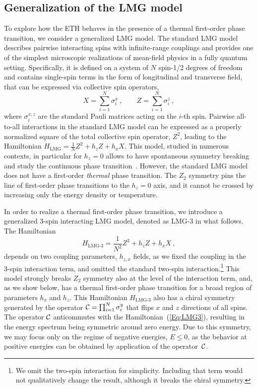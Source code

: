 \documentclass[aps,prx,showpacs,amsmath,amssymb,superscriptaddress,twocolumn,longbibliography,10pt,nofootinbib]{revtex4-2}
\begin{document}
\subsection{Generalization of the LMG model}
To explore how the ETH behaves in the presence of a thermal first-order phase transition, we consider a generalized LMG model.  The standard LMG model~\cite{LMG65,Trombettoni23} describes pairwise interacting spins with infinite-range couplings and provides one of the simplest microscopic realizations of mean-field physics in a fully quantum setting. Specifically, it is defined on a system of $N$ spin-1/2 degrees of freedom and contains single-spin terms in the form of longitudinal and transverse field, that can be expressed via collective spin operators, 
\begin{equation}\label{Eq:XZ}
X = \sum_{i=1}^N \sigma^x_i~,
\qquad 
Z = \sum_{i=1}^N \sigma^z_i~,
\end{equation}
where $\sigma_i^{x,z}$ are the standard Pauli matrices acting on the $i$-th spin. Pairwise all-to-all interactions in the standard LMG model can be expressed as a properly normalized square of the total collective spin operator, $Z^2$, leading to the Hamiltonian $H_\text{LMG} = \frac{1}{N} Z^2+ h_z Z+ h_x X$. This model, studied in numerous contexts, in particular for $h_z=0$ allows to have spontaneous symmetry breaking and study the continuous phase transition~\cite{LM06,Huse14}. However, the standard LMG model does not have a first-order {\it thermal} phase transition. The $Z_2$ symmetry pins the line of first-order phase transitions to the $h_z=0$ axis, and it cannot be crossed by increasing only the energy density or temperature. 

In order to realize a thermal first-order phase transition, we introduce a generalized 3-spin interacting LMG model, denoted as LMG-3 in what follows.  The Hamiltonian
\begin{equation}\label{Eq:LMG3}
H_\text{LMG-3} = 
\frac{1}{N^2} Z^3 + h_z Z + h_x X~,
\end{equation}
depends on two coupling parameters, $h_{z,x}$ fields, as we fixed the coupling in the 3-spin interaction term, and omitted the standard two-spin interaction.\footnote{We omit the two-spin interaction for simplicity. Including that term would not qualitatively change the result, although it breaks the chiral symmetry.}  This model strongly breaks $Z_2$ symmetry also at the level of the interaction term, and, as we show below,  has a thermal first-order phase transition for a broad region of parameters $h_x$ and $h_z$.  This Hamiltonian $H_\text{LMG-3}$ also has a chiral symmetry generated by the operator ${\cal C} = \prod_{i=1}^N \sigma^y_i$ that flips $x$ and $z$ directions of all spins. The operator $\cal C$ anticommutes with the Hamiltonian~(\ref{Eq:LMG3}), resulting in the energy spectrum being symmetric around zero energy. Due to this symmetry, we may focus only on the regime of negative energies, $E\leq 0$, as the behavior at positive energies can be obtained by application of the operator~$\cal C$. 
\end{document}
